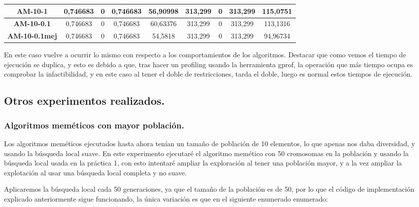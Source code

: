 \documentclass[12pt, spanish]{article}
\begin{document}
\begin{table}[H]
\begin{tabular}{|c|c|c|c|c|c|c|c|c|}
\textbf{AM-10-1}      & 0,746683                  & 0                           & 0,746683               & 56,90998   & 313,299                   & 0                           & 313,299                & 115,0751   \\ \hline
\textbf{AM-10-0.1}    &  0,746683               & 0                    &  0,746683                    & 60,63376      & 313,299                   & 0                           & 313,299                & 113,1316   \\ \hline
\textbf{AM-10-0.1mej} & 0,746683                  & 0                           & 0,746683               & 54,5818    & 313,299                   & 0                           & 313,299                & 94,96734   \\ \hline
\end{tabular}
\end{table}

En este caso vuelve a ocurrir lo mismo con respecto a los comportamientos de los algoritmos. Destacar que como vemos el tiempo de ejecución se duplica, y esto es debido a que, tras hacer un profiling usando la herramienta gprof, la operación que más tiempo ocupa es comprobar la infactibilidad, y en este caso al tener el doble de restricciones, tarda el doble, luego es normal estos tiempos de ejecución. 

\newpage

\subsection{Otros experimentos realizados.}

\subsubsection{Algoritmos meméticos con mayor población.}

Los algoritmos meméticos ejecutados hasta ahora tenían un tamaño de población de 10 elementos, lo que apenas nos daba diversidad, y usando la búsqueda local suave. En este experimento ejecutaré el algoritmo memético con 50 cromosomas en la población y usando la búsqueda local usada en la práctica 1, con esto intentaré ampliar la exploración al tener una población mayor, y a la vez ampliar la explotación al usar una búsqueda local completa y no suave.

Aplicaremos la búsqueda local cada 50 generaciones, ya que el tamaño de la población es de 50, por lo que el código de implementación explicado anteriormente sigue funcionando, la única variación es que en el siguiente enumerado enumerado:
\end{document}
